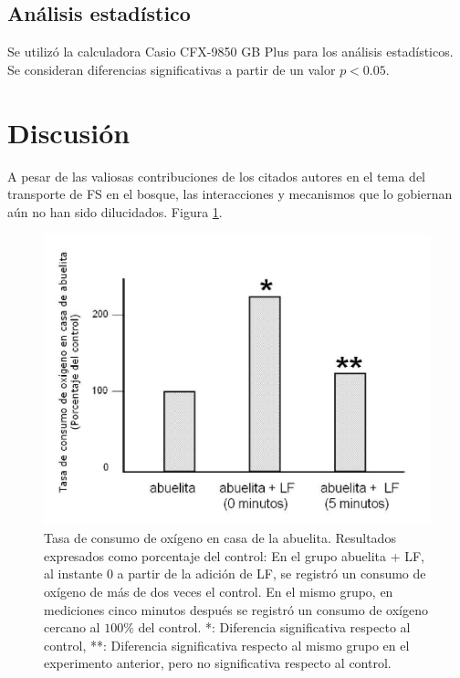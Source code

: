 \documentclass[fleqn,10pt]{AmateCodex} %
\begin{document}
\subsection{Análisis estadístico}
Se utilizó la calculadora Casio CFX-9850 GB Plus
para los análisis estadísticos. Se consideran
diferencias significativas a partir de un valor $p<0.05$.


\section{Discusión}
A pesar de las valiosas contribuciones de los citados
autores en el tema del transporte de FS en el bosque,
las interacciones y mecanismos que lo gobiernan aún
no han sido dilucidados. Figura \ref{fig:Caperucita-Fig02}.

\begin{figure}[h]\centering
\includegraphics[width=\linewidth]{imagenes/Caperucita-Fig02.png}
\caption{Tasa de consumo de oxígeno en casa de la abuelita. Resultados expresados como porcentaje del control: En el grupo abuelita + LF, al instante 0 a partir de la adición de LF, se registró un consumo de oxígeno de más de dos veces el control. En el mismo grupo, en mediciones cinco minutos después se registró un consumo de oxígeno cercano al $100\%$ del control. *: Diferencia significativa respecto al control, **: Diferencia significativa respecto al mismo grupo en el experimento anterior, pero no significativa respecto al control.}
\label{fig:Caperucita-Fig02}
\end{figure}
\end{document}
